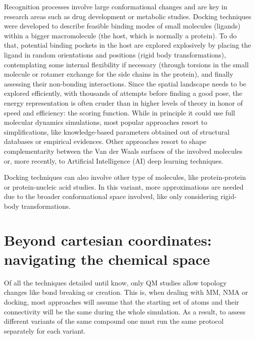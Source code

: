 Recognition processes involve large conformational changes and are key in research areas such as drug development or metabolic studies. Docking techniques were developed to describe feasible binding modes of small molecules (ligands) within a bigger macromolecule (the host, which is normally a protein). To do that, potential binding pockets in the host are explored explosively by placing the ligand in random orientations and positions (rigid body transformations), contemplating some internal flexibility if necessary (through torsions in the small molecule or rotamer exchange for the side chains in the protein), and finally assessing their non-bonding interactions. Since the spatial landscape needs to be explored efficiently, with thousands of attempts before finding a good pose, the energy representation is often cruder than in higher levels of theory in honor of speed and efficiency: the scoring function. While in principle it could use full molecular dynamics simulations,\cite{Soderhjelm_Tribello_Parrinello_2012,devivo2017} most popular approaches resort to simplifications, like knowledge-based parameters obtained out of structural databases\cite{neudert2011dsx} or empirical evidences.\cite{morris1998automated,baxter1998flexible,korb2009empirical} Other approaches resort to shape complementarity between the Van der Waals surfaces of the involved molecules\cite{venkatachalam2003ligandfit,gabb1997modelling,shoichet1992molecular} or, more recently, to Artificial Intelligence (AI) deep learning techniques.\cite{khamis2015machine}

Docking techniques can also involve other type of molecules, like protein-protein or protein-nucleic acid studies. In this variant, more approximations are needed due to the broader conformational space involved, like only considering rigid-body transformations.

\section{Beyond cartesian coordinates: navigating the chemical space}

Of all the techniques detailed until know, only QM studies allow topology changes like bond breaking or creation. This is, when dealing with MM, NMA or docking, most approaches will assume that the starting set of atoms and their connectivity will be the same during the whole simulation. As a result, to assess different variants of the same compound one must run the same protocol separately for each variant.

